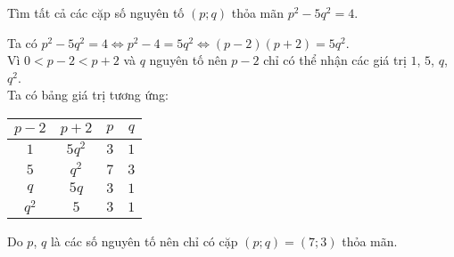 \begin{bt}%
\hfill
Tìm tất cả các cặp số nguyên tố $(p;q)$ thỏa mãn $p^2-5q^2=4$.
\loigiai
{
	Ta có $p^2-5q^2=4 \Leftrightarrow p^2-4=5q^2 \Leftrightarrow (p-2)(p+2)=5q^2$.\\
	Vì $0<p-2<p+2$ và $q$ nguyên tố nên $p-2$ chỉ có thể nhận các giá trị $1$, $5$, $q$, $q^2$.\\
	Ta có bảng giá trị tương ứng:
	\begin{center}
		\begin{tabular}{|c|c|c|c|} 
			\hline
			$p-2$ & $p+2$ & $p$ & $q$ \\ 
			\hline
			$1$ & $5q^2$ & $3$ & $1$ \\ 
			\hline
			$5$ & $q^2$ & $7$ & $3$ \\ 
			\hline
			$q$ & $5q$ & $3$ & $1$ \\ 
			\hline
			$q^2$ & $5$ & $3$ & $1$ \\ 
			\hline
		\end{tabular}
	\end{center}
	Do $p$, $q$ là các số nguyên tố nên chỉ có cặp $(p;q)=(7;3)$ thỏa mãn.
}
\end{bt}


